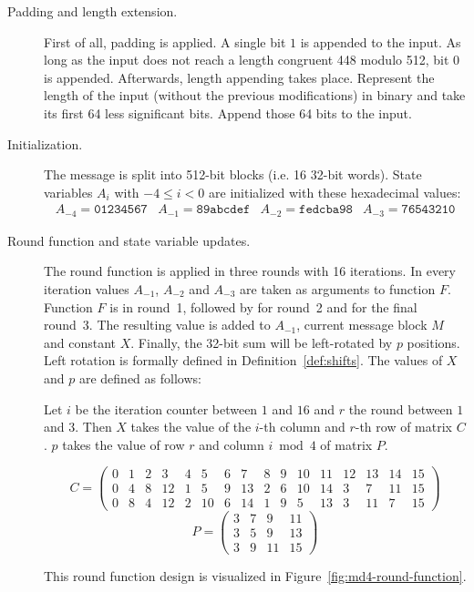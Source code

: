 \begin{description}
  \item[Padding and length extension.]
    First of all, padding is applied. A single bit $1$ is appended to the
    input. As long as the input does not reach a length congruent 448 modulo 512,
    bit $0$ is appended.
    Afterwards, length appending takes place. Represent the length of the input
    (without the previous modifications) in binary and take its first
    64 less significant bits. Append those 64 bits to the input.
  \item[Initialization.]
    The message is split into 512-bit blocks (i.e. 16 32-bit words).
    State variables $A_{i}$ with $-4 \leq i < 0$ are initialized with these
    hexadecimal values:
    \[
      \begin{array}{cccc}
        A_{-4} = \texttt{01234567} &
        A_{-1} = \texttt{89abcdef} &
        A_{-2} = \texttt{fedcba98} &
        A_{-3} = \texttt{76543210}
      \end{array}
    \]
  \item[Round function and state variable updates.]
    The round function is applied in three rounds with 16 iterations.
    In every iteration values $A_{-1}$, $A_{-2}$ and $A_{-3}$ are taken
    as arguments to function $F$. Function $F$ is  in round~1,
    followed by  for round~2 and  for the final round~3.
    The resulting value is added to $A_{-1}$, current message block $M$
    and constant $X$. Finally, the 32-bit sum will be left-rotated by $p$
    positions. Left rotation is formally defined in Definition~\ref{def:shifts}.
    The values of $X$ and $p$ are defined as follows:

    Let $i$ be the iteration counter between $1$ and $16$ and
    $r$ the round between $1$ and $3$. Then $X$ takes the value
    of the $i$-th column and $r$-th row of matrix $C$.
    $p$ takes the value of row $r$ and column $i \bmod{4}$ of matrix $P$.

    \[
      C = \left(\begin{array}{cccccccccccccccc}
        0 & 1 & 2 & 3 & 4 & 5 & 6 & 7 & 8 & 9 & 10 & 11 & 12 & 13 & 14 & 15 \\
        0 & 4 & 8 & 12 & 1 & 5 & 9 & 13 & 2 & 6 & 10 & 14 & 3 & 7 & 11 & 15 \\
        0 & 8 & 4 & 12 & 2 & 10 & 6 & 14 & 1 & 9 & 5 & 13 & 3 & 11 & 7 & 15
      \end{array}\right)
    \] \[
      P = \begin{pmatrix}
        3 & 7 & 9 & 11 \\
        3 & 5 & 9 & 13 \\
        3 & 9 & 11 & 15
      \end{pmatrix}
    \]

    This round function design is visualized in Figure~\ref{fig:md4-round-function}.
\end{description}

